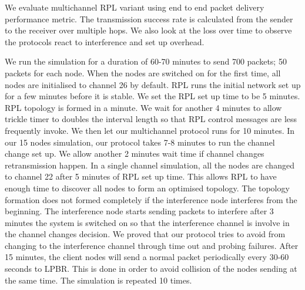 We evaluate multichannel RPL variant using end to end packet delivery performance metric. The transmission success rate is calculated from the sender to the receiver over multiple hops. We also look at the loss over time to observe the protocols react to interference and set up overhead.


We run the simulation for a duration of 60-70 minutes to send 700 packets; 50 packets for each node. When the nodes are switched on for the first time, all nodes are initialised to channel 26 by default. RPL runs the initial network set up for a few minutes before it is stable. We set the RPL set up time to be 5 minutes. RPL topology is formed in a minute. We wait for another 4 minutes to allow trickle timer to doubles the interval length so that RPL control messages are less frequently invoke. We then let our multichannel protocol runs for 10 minutes. In our 15 nodes simulation, our protocol takes 7-8 minutes to run the channel change set up. We allow another 2 minutes wait time if channel changes retransmission happen. In a single channel simulation, all the nodes are changed to channel 22 after 5 minutes of RPL set up time. This allows RPL to have enough time to discover all nodes to form an optimised topology. The topology formation does not formed completely if the interference node interferes from the beginning. The interference node starts sending packets to interfere after 3 minutes the system is switched on so that the interference channel is involve in the channel changes decision. We proved that our protocol tries to avoid from changing to the interference channel through time out and probing failures. After 15 minutes, the client nodes will send a normal packet periodically every 30-60 seconds to LPBR. This is done in order to avoid collision of the nodes sending at the same time. The simulation is repeated 10 times.



